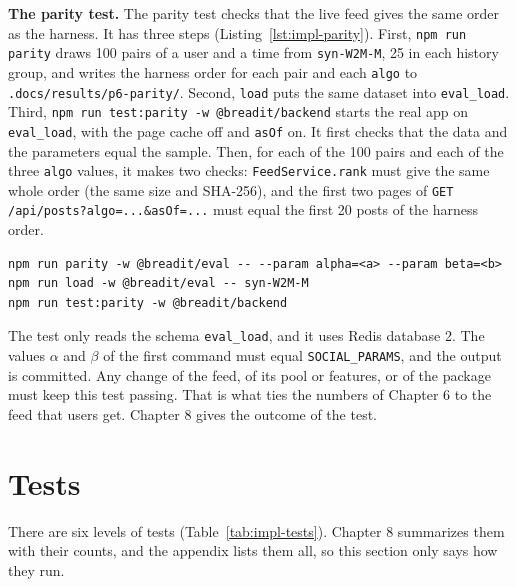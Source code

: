 \textbf{The parity test.} The parity test checks that the live feed gives the same order as the harness. It has three steps (Listing~\ref{lst:impl-parity}). First, \texttt{npm run parity} draws 100 pairs of a user and a time from \texttt{syn-W2M-M}, 25 in each history group, and writes the harness order for each pair and each \texttt{algo} to \texttt{.docs/results/p6-parity/}. Second, \texttt{load} puts the same dataset into \texttt{eval\_load}. Third, \texttt{npm run test:parity -w @breadit/backend} starts the real app on \texttt{eval\_load}, with the page cache off and \texttt{asOf} on. It first checks that the data and the parameters equal the sample. Then, for each of the 100 pairs and each of the three \texttt{algo} values, it makes two checks: \texttt{FeedService.rank} must give the same whole order (the same size and SHA-256), and the first two pages of \texttt{GET /api/posts?algo=...\&asOf=...} must equal the first 20 posts of the harness order.

\begin{lstlisting}[caption={The three commands of the parity check.}, label=lst:impl-parity]
npm run parity -w @breadit/eval -- --param alpha=<a> --param beta=<b>
npm run load -w @breadit/eval -- syn-W2M-M
npm run test:parity -w @breadit/backend
\end{lstlisting}

The test only reads the schema \texttt{eval\_load}, and it uses Redis database 2. The values $\alpha$ and $\beta$ of the first command must equal \texttt{SOCIAL\_PARAMS}, and the output is committed. Any change of the feed, of its pool or features, or of the package must keep this test passing. That is what ties the numbers of Chapter 6 to the feed that users get. Chapter 8 gives the outcome of the test.

\section{Tests}
\label{sec:impl-tests}

There are six levels of tests (Table~\ref{tab:impl-tests}). Chapter 8 summarizes them with their counts, and the appendix lists them all, so this section only says how they run.

